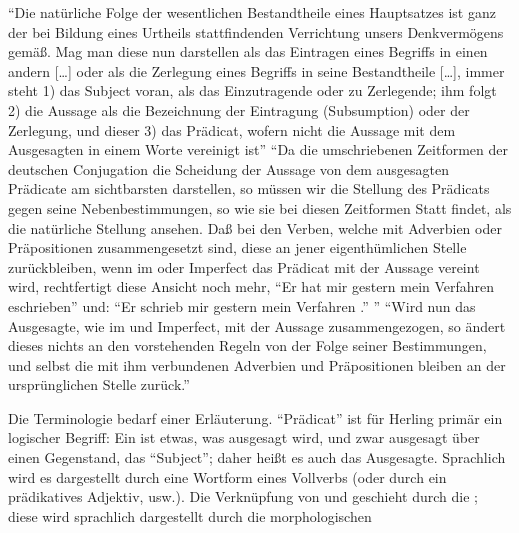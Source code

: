 \documentclass[output=paper]{langsci/langscibook}
\begin{document}
\begin{exe}
\ex\label{ex:1-3-12}
\begin{xlist}
\ex\label{ex:1-3-12a}  "`Die natürliche Folge der wesentlichen Bestandtheile eines Hauptsatzes ist
ganz der bei Bildung eines Urtheils stattfindenden Verrichtung unsers
Denkvermögens gemäß. Mag man diese nun darstellen als das Eintragen eines Begriffs in einen andern [\ldots] oder als die Zerlegung eines Begriffs in seine Bestandtheile [\ldots], immer steht 1) das Subject voran, als das Einzutragende oder zu Zerlegende; ihm folgt 2) die Aussage als die Bezeichnung der
Eintragung (Subsumption) oder der Zerlegung, und dieser 3) das Prädicat,
wofern nicht die Aussage mit dem Ausgesagten in einem Worte vereinigt
ist"' \citep[297]{Herling1821T}
\ex\label{ex:1-3-12b} "`Da die umschriebenen Zeitformen der deutschen Conjugation die Scheidung der Aussage von dem ausgesagten Prädicate am sichtbarsten darstellen, so müssen wir die Stellung des Prädicats gegen seine Nebenbestimmungen, so wie sie bei diesen Zeitformen Statt findet, als die natürliche Stellung
ansehen. Daß bei den Verben, welche mit Adverbien oder Präpositionen
zusammengesetzt sind, diese an jener eigenthümlichen Stelle zurückbleiben,
wenn im  oder Imperfect das Prädicat mit der Aussage vereint wird,
rechtfertigt diese Ansicht noch mehr, \zb "`Er hat mir gestern mein Verfahren eschrieben"' und: "`Er schrieb mir gestern mein Verfahren ."' "'
\citep[298f]{Herling1821T}
\ex\label{ex:1-3-12c} "`Wird nun das Ausgesagte, wie im  und Imperfect, mit der Aussage
zusammengezogen, so ändert dieses nichts an den vorstehenden Regeln von
der Folge seiner Bestimmungen, und selbst die mit ihm verbundenen Adverbien und Präpositionen bleiben an der ursprünglichen Stelle zurück."' \citep[306f]{Herling1821T}
\end{xlist}
\end{exe}
Die Terminologie bedarf einer Erläuterung. "`Prädicat"' ist für Herling primär ein logischer Begriff: Ein  ist etwas, was ausgesagt wird, und zwar ausgesagt über
einen Gegenstand, das "`Subject"'; daher heißt es auch das Ausgesagte. Sprachlich
wird es dargestellt durch eine Wortform eines Vollverbs (oder durch ein prädikatives Adjektiv,  usw.). Die Verknüpfung von  und  geschieht
durch die ; diese wird sprachlich dargestellt durch die morphologischen
\end{document}
